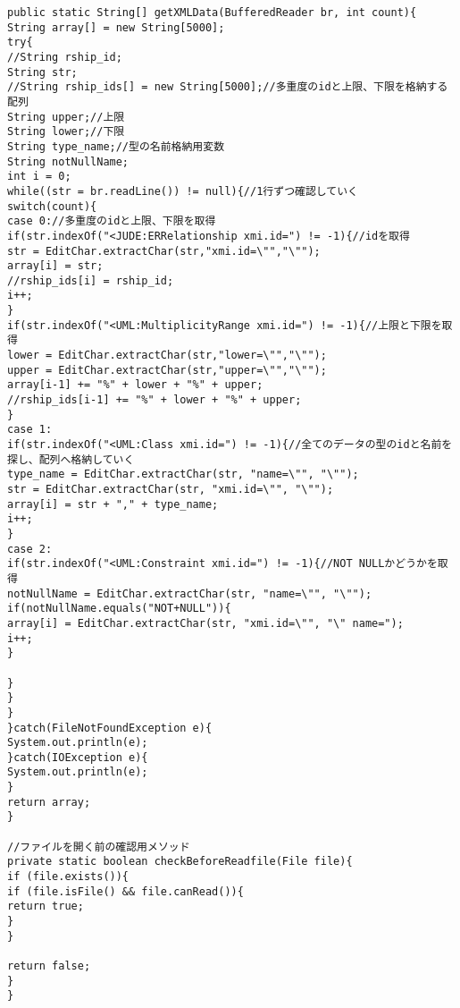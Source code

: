 \documentclass{funthesis}
\begin{document}
\begin{lstlisting}[caption=LoadER.java,label=1]
public static String[] getXMLData(BufferedReader br, int count){
String array[] = new String[5000];
try{
//String rship_id;
String str;
//String rship_ids[] = new String[5000];//多重度のidと上限、下限を格納する配列
String upper;//上限
String lower;//下限
String type_name;//型の名前格納用変数
String notNullName;
int i = 0;
while((str = br.readLine()) != null){//1行ずつ確認していく
switch(count){
case 0://多重度のidと上限、下限を取得
if(str.indexOf("<JUDE:ERRelationship xmi.id=") != -1){//idを取得
str = EditChar.extractChar(str,"xmi.id=\"","\"");
array[i] = str;
//rship_ids[i] = rship_id;
i++;
}
if(str.indexOf("<UML:MultiplicityRange xmi.id=") != -1){//上限と下限を取得
lower = EditChar.extractChar(str,"lower=\"","\"");
upper = EditChar.extractChar(str,"upper=\"","\"");
array[i-1] += "%" + lower + "%" + upper;
//rship_ids[i-1] += "%" + lower + "%" + upper;
}
case 1:
if(str.indexOf("<UML:Class xmi.id=") != -1){//全てのデータの型のidと名前を探し、配列へ格納していく
type_name = EditChar.extractChar(str, "name=\"", "\"");
str = EditChar.extractChar(str, "xmi.id=\"", "\"");
array[i] = str + "," + type_name;
i++;
}
case 2:
if(str.indexOf("<UML:Constraint xmi.id=") != -1){//NOT NULLかどうかを取得
notNullName = EditChar.extractChar(str, "name=\"", "\"");
if(notNullName.equals("NOT+NULL")){
array[i] = EditChar.extractChar(str, "xmi.id=\"", "\" name=");
i++;
}

}
}
}
}catch(FileNotFoundException e){
System.out.println(e);
}catch(IOException e){
System.out.println(e);
}
return array;
}

//ファイルを開く前の確認用メソッド
private static boolean checkBeforeReadfile(File file){
if (file.exists()){
if (file.isFile() && file.canRead()){
return true;
}
}

return false;
}
}
\end{lstlisting}　
\end{document}
